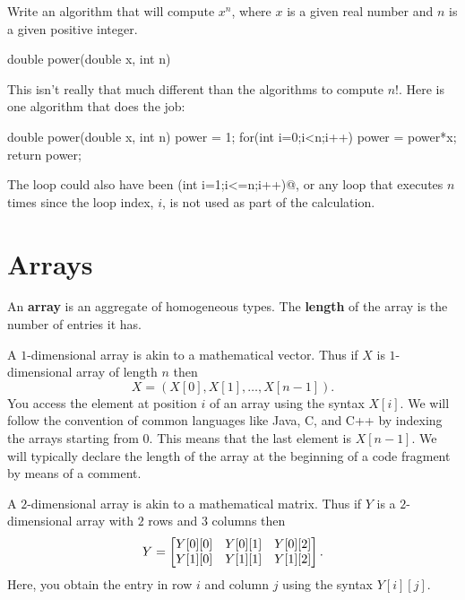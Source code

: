 \begin{exer}\label{exa:powers1} 
Write an algorithm that will compute $x^n$, 
where $x$ is a given real number and $n$ is a given positive integer.
\begin{code}
    double power(double x, int n) {
        
        
        
        
        
        
        
        
    }
\end{code}
\begin{answer}
This isn't really that much different than the algorithms to compute $n!$.
Here is one algorithm that does the job:
\begin{code}
    double power(double x, int n) {
        power = 1;
        for(int i=0;i<n;i++) {
            power = power*x;
        }
        return power;
    }
\end{code} 
The loop could also have been \verb@for(int i=1;i<=n;i++)@, 
or any loop that executes $n$ times since the loop index, $i$, is not used as part
of the calculation.
\end{answer}
\end{exer}


\newpage

\section{Arrays}\label{section:arrays}
\begin{df}
An {\bf array} is an aggregate of homogeneous types. The {\bf
length} of the array is the number of entries it has.
\end{df}
A $1$-dimensional array is akin to a mathematical vector. Thus
if $X$ is $1$-dimensional array of length $n$ then
$$X = (X[0], X[1], \ldots , X[n-1]).$$ 
You access the element at position $i$ of 
an array using the syntax $X[i]$.
We will
follow the convention of common languages like Java, C, and C++ by indexing the arrays starting from $0$.
This means that the last element is $X[n-1]$.
We will typically declare the length of the array at the beginning of
a code fragment by means of a comment.

\bigskip
A $2$-dimensional array is akin to a
mathematical matrix. Thus if $Y$ is a $2$-dimensional array with
$2$ rows and $3$ columns then 
$$Y = \begin{bmatrix} Y[0][0] &
Y[0][1] & Y[0][2] \cr Y[1][0] & Y[1][1] & Y[1][2] \cr
\end{bmatrix} .
$$
Here, you obtain the entry in row $i$ and column $j$ using
the syntax $Y[i][j]$.

